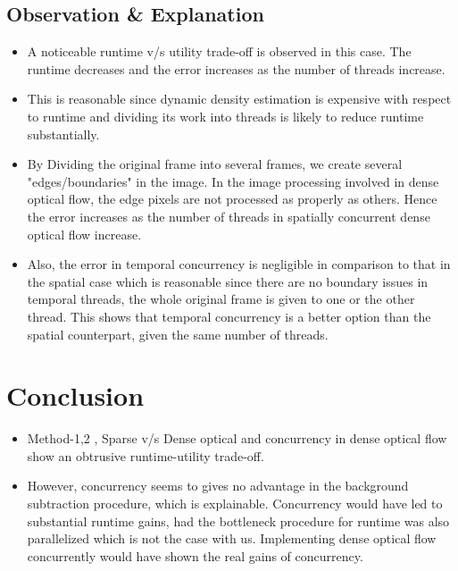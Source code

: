 \documentclass[a4paper]{article}
\begin{document}
\subsection*{Observation \& Explanation}
\begin{itemize}
    \item A noticeable runtime v/s utility trade-off is observed in this case. The runtime decreases and the error increases as the number of threads increase.
    \item  This is reasonable since dynamic density estimation is expensive with respect to runtime and dividing its work into threads is likely to reduce runtime substantially.
    \item By Dividing the original frame into several frames, we create several "edges/boundaries" in the image. In the image processing involved in dense optical flow, the edge pixels are not processed as properly as others. Hence the error increases as the number of threads in spatially concurrent dense optical flow increase.
    \item Also, the error in temporal concurrency is negligible in comparison to that in the spatial case which is reasonable since there are no boundary issues in temporal threads, the whole original frame is given to one or the other thread. This shows that temporal concurrency is a better option than the spatial counterpart, given the same number of threads.
\end{itemize}
\section*{Conclusion}
\begin{itemize}
    \item Method-1,2 , Sparse v/s Dense optical and concurrency in dense optical flow show an obtrusive runtime-utility trade-off.
    \item  However, concurrency seems to gives no advantage in the background subtraction procedure, which is explainable. Concurrency would have led to substantial runtime gains, had the bottleneck procedure for runtime was also parallelized which is not the case with us. Implementing dense optical flow concurrently would have shown the real gains of concurrency. 
\end{itemize}
\end{document}
